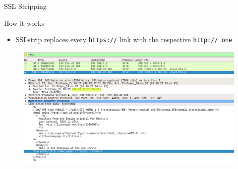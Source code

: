 \documentclass{beamer}
\begin{document}
\begin{frame}{SSL Stripping}
  \begin{block}{How it works}
    \begin{itemize}
      \item SSLstrip replaces every \texttt{https://} link with the respective \texttt{http:// one}
    \end{itemize}
  \end{block}
  \begin{figure}
    \includegraphics[width=\textwidth]{figures/sslstrip_http}
    \caption*{}
  \end{figure}
\end{frame}
\end{document}
